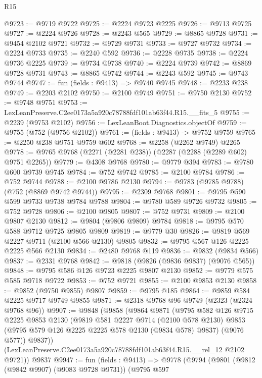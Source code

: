 \begin{lexlean}{R15}
\begin{coremodule}
@9723 := @9719 @9722
@9725 := @2224 @9723 @2225
@9726 := @9713 @9725
@9727 := @2224 @9726
@9728 := @2243 @565
@9729 := @8865 @9728
@9731 := @9454 @2102 @9721
@9732 := @9729 @9731
@9733 := @9727 @9732
@9734 := @2224 @9733
@9735 := @2240 @592
@9736 := @2228 @9735
@9738 := @2224 @9736 @2225
@9739 := @9734 @9738
@9740 := @2224 @9739
@9742 := @8869 @9728 @9731
@9743 := @8865 @9742
@9744 := @2243 @592
@9745 := @9743 @9744
@9747 := fun (fields : @9413) => @9740 @9745
@9748 := @2233 @238
@9749 := @2203 @2102
@9750 := @2100 @9749
@9751 := @9750 @2130
@9752 := @9748 @9751
@9753 := LexLeanPreserve.C2ee0173a5a920c78788fdf101ab63f44.R15.__fits_5
@9755 := @2239 (@9753 @2102)
@9756 := LexLeanBoot.Diagnostics.objectOf
@9759 := @9755 (@752 (@9756 @2102))
@9761 := (fields : @9413) -> @9752 @9759
@9765 := @2250 @238 @9751 @9759 @602
@9768 := @2258 (@2262 @9749) @2265
@9778 := @9765 @9768 (@2271 (@2281 @238)) (@2287 (@2288 (@2289 @602) @9751 @2265))
@9779 := @4308 @9768
@9780 := @9779 @394
@9783 := @9780 @600 @9739 @9745
@9784 := @752 @9742
@9785 := @2100 @9784
@9786 := @752 @9744
@9788 := @2100 @9786 @2130
@9794 := @9783 (@9785 @9788) (@752 (@8869 @9742 @9744))
@9795 := @2309 @9768
@9801 := @9795 @590 @599 @9733 @9738 @9784 @9788
@9804 := @9780 @589 @9726 @9732
@9805 := @752 @9728
@9806 := @2100 @9805
@9807 := @752 @9731
@9809 := @2100 @9807 @2130
@9812 := @9804 (@9806 @9809) @9784
@9818 := @9795 @570 @588 @9712 @9725 @9805 @9809
@9819 := @9779 @30
@9826 := @9819 @569 @2227 @9711 (@2100 @566 @2130) @9805
@9832 := @9795 @567 @126 @2225 @2225 @566 @2130
@9834 := @2480 @9768 @119
@9836 := @9832 (@9834 @566)
@9837 := @2331 @9768
@9842 := @9818 (@9826 (@9836 @9837) (@9076 @565))
@9848 := @9795 @586 @126 @9723 @2225 @9807 @2130
@9852 := @9779 @575 @585 @9718 @9722
@9853 := @752 @9721
@9855 := @2100 @9853 @2130
@9858 := @9852 (@9750 @9855) @9807
@9859 := @9795 @185
@9864 := @9859 @584 @2225 @9717 @9749 @9855
@9871 := @2318 @9768 @96 @9749 (@2323 (@2324 @9768 @96))
@9907 := @9848
    (@9858
      (@9864
        @9871
        (@9795
          @582
          @126
          @9715
          @2225
          @9853
          @2130
          (@9819
            @581
            @2227
            @9714
            (@2100 @578 @2130)
            @9853
            (@9795 @579 @126 @2225 @2225 @578 @2130 (@9834 @578) @9837)
            (@9076 @577))
          @9837))
      (LexLeanPreserve.C2ee0173a5a920c78788fdf101ab63f44.R15.__rel_12 @2102 @9721))
    @9837
@9947 := fun (fields : @9413) =>
  @9778
    (@9794
      (@9801
        (@9812 (@9842 @9907) (@9083 @9728 @9731))
        (@9795
          @597

\end{coremodule}
\end{lexlean}
